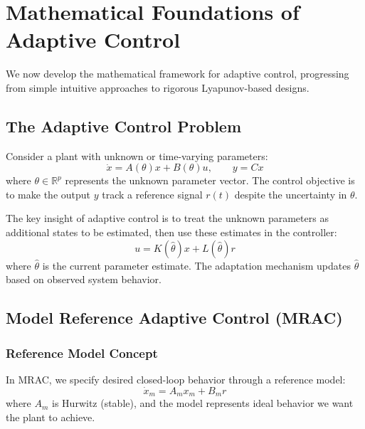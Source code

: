 \section{Mathematical Foundations of Adaptive Control}
\label{sec:adaptive_math}

We now develop the mathematical framework for adaptive control, progressing from simple intuitive approaches to rigorous Lyapunov-based designs.

\subsection{The Adaptive Control Problem}

Consider a plant with unknown or time-varying parameters:
\begin{equation}
\dot{x} = A(\theta)x + B(\theta)u, \qquad y = Cx
\label{eq:uncertain_plant}
\end{equation}
where $\theta \in \mathbb{R}^p$ represents the unknown parameter vector. The control objective is to make the output $y$ track a reference signal $r(t)$ despite the uncertainty in $\theta$.

The key insight of adaptive control is to treat the unknown parameters as additional states to be estimated, then use these estimates in the controller:
\begin{equation}
u = K(\hat{\theta})x + L(\hat{\theta})r
\label{eq:adaptive_controller}
\end{equation}
where $\hat{\theta}$ is the current parameter estimate. The adaptation mechanism updates $\hat{\theta}$ based on observed system behavior.

\subsection{Model Reference Adaptive Control (MRAC)}

\subsubsection{Reference Model Concept}

In MRAC, we specify desired closed-loop behavior through a reference model:
\begin{equation}
\dot{x}_m = A_m x_m + B_m r
\label{eq:reference_model}
\end{equation}
where $A_m$ is Hurwitz (stable), and the model represents ideal behavior we want the plant to achieve.

